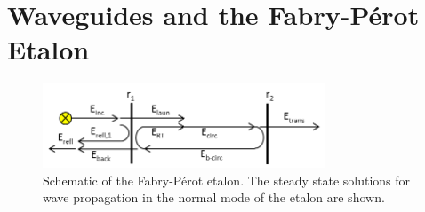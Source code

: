 \documentclass{report}
\begin{document}
    \section{Waveguides and the Fabry-P\'erot Etalon}
        \begin{figure}
            \centering
            \includegraphics[width=0.75\textwidth]{images/etalon_schematic.png}
            \caption{Schematic of the Fabry-P\'erot etalon. The steady state solutions for wave propagation in the normal mode of the etalon are shown\cite{Ismail2016}.}
            \label{fig:etalon}
        \end{figure}
\end{document}
